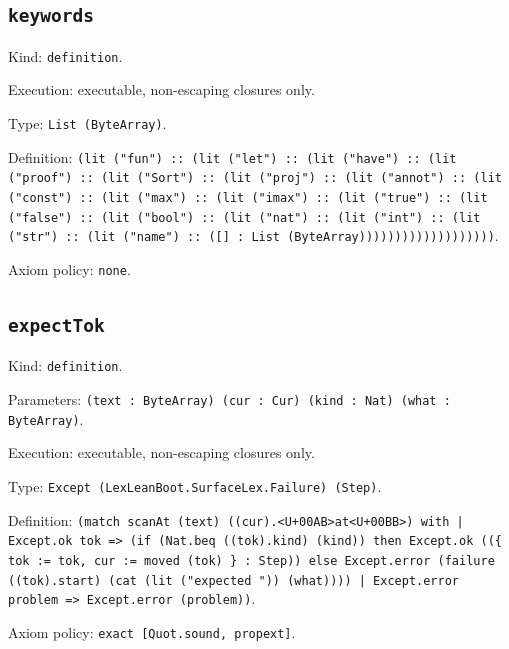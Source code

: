 \documentclass[11pt]{article}
\begin{document}
\subsection*{\texttt{keywords}}
\noindent Kind: \texttt{definition}.\par
\noindent Execution: executable, non-escaping closures only.\par
\noindent Type: \texttt{List (ByteArray)}.\par
\noindent Definition: \texttt{(lit ("fun") :: (lit ("let") :: (lit ("have") :: (lit ("proof") :: (lit ("Sort") :: (lit ("proj") :: (lit ("annot") :: (lit ("const") :: (lit ("max") :: (lit ("imax") :: (lit ("true") :: (lit ("false") :: (lit ("bool") :: (lit ("nat") :: (lit ("int") :: (lit ("str") :: (lit ("name") :: ([] : List (ByteArray)))))))))))))))))))}.\par
\noindent Axiom policy: \texttt{none}.\par
\subsection*{\texttt{expectTok}}
\noindent Kind: \texttt{definition}.\par
\noindent Parameters: \texttt{(text : ByteArray) (cur : Cur) (kind : Nat) (what : ByteArray)}.\par
\noindent Execution: executable, non-escaping closures only.\par
\noindent Type: \texttt{Except (LexLeanBoot.SurfaceLex.Failure) (Step)}.\par
\noindent Definition: \texttt{(match scanAt (text) ((cur).<U+00AB>at<U+00BB>) with | Except.ok tok => (if (Nat.beq ((tok).kind) (kind)) then Except.ok ((\{ tok := tok, cur := moved (tok) \} : Step)) else Except.error (failure ((tok).start) (cat (lit ("expected ")) (what)))) | Except.error problem => Except.error (problem))}.\par
\noindent Axiom policy: \texttt{exact [Quot.sound, propext]}.\par
\end{document}
